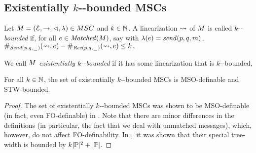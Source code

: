 \documentclass[a4paper,UKenglish,cleveref, autoref, thm-restate]{lipics-v2021}
\def\islongversion{yes}
\def\yes{yes}
\begin{document}
 
\existkmailboxbounded*
%
 


\subsection{Existentially $k$-\pp-bounded MSCs}\label{appendix:existentiallyptop}
\begin{definition}
Let $\msc = (\Events,\procrel,\lhd,\lambda) \in \MSCs$ and $k \in \mathbb{N}$.
A linearization $\rightsquigarrow$ of $M$ is called
$k$-\emph{\pp-bounded} if, for all $e \in \mathit{Matched}(M)$, say with $\lambda(e) = \mathit{send}(p, q, m)$,
\\ $\#_{{\mathit{Send}(p,q,\hspace{0.1em}\underline{\hspace{0.5em}}\hspace{0.1em})}}(\rightsquigarrow,e) - \#_{{\mathit{Rec}(p,q,\hspace{0.1em}\underline{\hspace{0.5em}}\hspace{0.1em})}}(\rightsquigarrow,e) \le k\,,$

We call $M$
\emph{existentially $k$-\pp-bounded} if
it has some \pp linearization that is $k$-\pp-bounded,
\end{definition}

 \begin{proposition}
 \label{prop:exists-k-p2p-bounded}
 For all $k \in \mathbb{N}$, the set of existentially $k$-\pp-bounded MSCs
 is MSO-definable and STW-bounded.
 \end{proposition}

 \begin{proof}
 The set of existentially $k$-\pp-bounded MSCs was shown to be MSO-definable
 (in fact, even FO-definable) in \cite{DBLP:journals/iandc/LohreyM04}. Note that there are minor differences
 in the definitions (in particular, the fact that we deal with unmatched messages),
 which, however, do not affect FO-definability.
 In \cite[Proposition 5.4, page 163]{DBLP:journals/corr/abs-1904-06942},\
 it was shown that their special tree-width is bounded by $k|\mathbb{P}|^2 + |\mathbb{P}|$.
 \end{proof}
\end{document}
